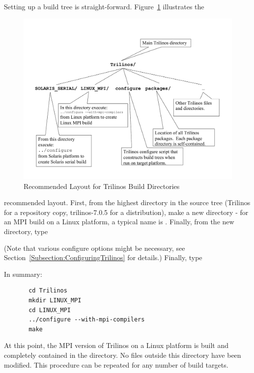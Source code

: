 Setting up a build tree is straight-forward.
Figure~\ref{Figure:TrilinosDirectoryStructure} illustrates the
\begin{figure}
\begin{center}
\includegraphics[width=6in]{../CommonFiles/TrilinosDirectoryStructure}
\end{center}
\caption{\label{Figure:TrilinosDirectoryStructure}Recommended Layout for Trilinos Build Directories}
\end{figure}recommended layout.  First, from the highest 
directory in the source tree (Trilinos for a repository copy, trilinos-7.0.5 
for a distribution), make a new directory - for an MPI build
on a Linux platform, a 
typical name is .  
Finally, from the new directory, type


(Note that various configure options might be necessary, see Section~\ref{Subsection:ConfiguringTrilinos} for details.)  Finally, type



In summary:

\begin{verbatim}
       cd Trilinos
       mkdir LINUX_MPI
       cd LINUX_MPI
       ../configure --with-mpi-compilers
       make
\end{verbatim}
At this point, the MPI version of Trilinos on a Linux platform is
built and completely contained in the 
directory.  No files outside this directory have been modified.  This
procedure can be repeated for any number of build targets.

